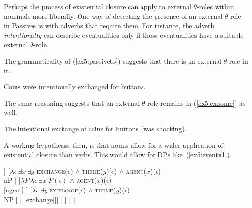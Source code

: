 Perhaps the process of existential closure can apply to external $\theta$-roles within nominals more liberally. One way of detecting the presence of an external $\theta$-role in Passives is with adverbs that require them. For instance, the adverb \emph{intentionally} can describe eventualities only if those eventualities have a suitable external $\theta$-role.%
%
%
%
\begin{exe}
	\raggedright
	\ex \label{ex5:agento} 
	\begin{xlist}
	\end{xlist}
\end{exe}
The grammaticality of (\ref{ex5:passiveto}) suggests that there is an external $\theta$-role in it.
\begin{exe}
	\raggedright
	\ex \label{ex5:passiveto} 
	Coins were intentionally exchanged for buttons.
\end{exe}
The same reasoning suggests that an external $\theta$-role remains in (\ref{ex5:exnome}) as well.
\begin{exe}
	\raggedright
	\ex \label{ex5:exnome} 
	The intentional exchange of coins for buttons (was shocking).
\end{exe}
A working hypothesis, then, is that nouns allow for a wider application of existential closure than verbs. This would allow for DPs like~(\ref{ex5:eventn1}).
\begin{fullwidth}
\medskip
\begin{exe}
	\raggedright
	\ex \label{ex5:eventn1} 
	\small
	\begin{forest}
	[DP
		[\obar{D} [the] ]
		[$\lambda \epsilon\ \exists x\ \exists y$ \textsc{exchange}($\epsilon$) $\wedge$ \textsc{theme}($y$)($\epsilon$) $\wedge$ \textsc{agent}($x$)($\epsilon$)\\ nP [
			[$\lambda P\ \lambda \epsilon\ \exists x$  $P(\epsilon)$ $\wedge$ \textsc{agent}($x$)($\epsilon$)\\  ]
			[$\lambda \epsilon\ \exists y$ \textsc{exchange}($\epsilon$) $\wedge$ \textsc{theme}($y$)($\epsilon$)\\ NP [ [ [exchange]]] ]
		] ]
	]
	\end{forest}
\end{exe}
\end{fullwidth}
